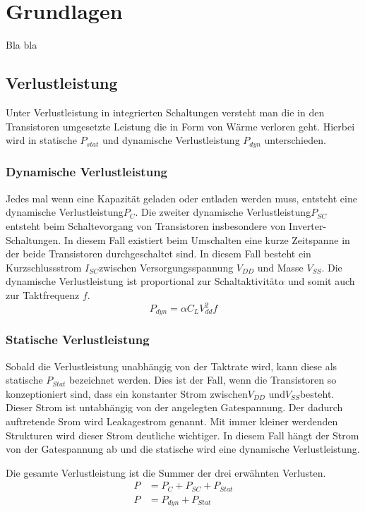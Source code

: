 \chapter{Grundlagen}
\label{chap:grundlagen}

Bla bla

\section{Verlustleistung}
\label{sec:verlustleistung}
Unter Verlustleistung in integrierten Schaltungen versteht man die in den Transistoren umgesetzte Leistung die in Form von Wärme verloren geht.
Hierbei wird in statische \(P_{stat}\) und dynamische Verlustleistung \(P_{dyn}\) unterschieden. 
\subsection{Dynamische Verlustleistung}
Jedes mal wenn eine Kapazität geladen oder entladen werden muss, entsteht eine dynamische Verlustleistung\(P_C\). Die zweiter dynamische Verlustleistung\(P_{SC}\) entsteht beim Schaltevorgang von Transistoren insbesondere von Inverter-Schaltungen. In diesem Fall existiert beim Umschalten eine kurze Zeitspanne in der beide Transistoren durchgeschaltet sind. In diesem Fall besteht ein Kurzschlussstrom \(I_{SC}\)zwischen Versorgungsspannung \(V_{DD}\) und Masse \(V_{SS}\). Die dynamische Verlustleistung ist proportional zur Schaltaktivität\(\alpha\) und somit auch zur Taktfrequenz $f$.
\begin{equation}
P_{dyn} = \alpha  C_L  V_{dd}^{2}  f
\label{eq:dynVerlustleistung}
\end{equation}
\subsection{Statische Verlustleistung}
Sobald die Verlustleistung unabhängig von der Taktrate wird, kann diese als statische \(P_{Stat}\) bezeichnet werden. Dies ist der Fall, wenn die Transistoren so konzeptioniert sind, dass ein konstanter Strom zwischen\(V_{DD}\) und\(V_{SS}\)besteht. Dieser Strom ist untabhängig von der angelegten Gatespannung. Der dadurch auftretende Srom wird Leakagestrom genannt. Mit immer kleiner werdenden Strukturen wird dieser Strom deutliche wichtiger. In diesem Fall hängt der Strom von der Gatespannung ab und die statische wird eine dynamische Verlustleistung.


Die gesamte Verlustleistung ist die Summer der drei erwähnten Verlusten.
\begin{equation}
	\begin{aligned}
		P &= P_{ C }+P_{ SC }+P_{ Stat}\\
		P &= P_{dyn}+P_{Stat}
	\label{eq:verlustleistung}
	\end{aligned}
\end{equation}

